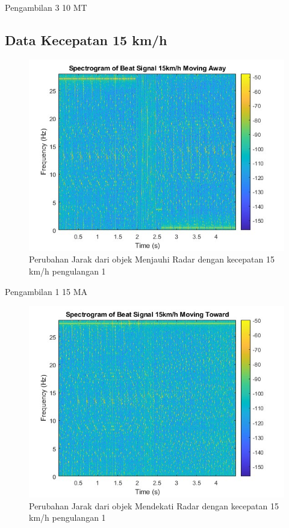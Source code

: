 Pengambilan 3 10 MT

\subsection{Data Kecepatan 15 km/h}

\begin{figure}
	\centering
	\includegraphics[scale=0.6]{pics/bab5/Velocity/1_15MA.jpg}
	\caption{Perubahan Jarak dari objek Menjauhi Radar dengan kecepatan 15 km/h pengulangan 1}
	\label{fig:pengambilan1_15MA}
\end{figure}

Pengambilan 1 15 MA

\begin{figure}
	\centering
	\includegraphics[scale=0.6]{pics/bab5/Velocity/1_15MT.jpg}
	\caption{Perubahan Jarak dari objek Mendekati Radar dengan kecepatan 15 km/h pengulangan 1}
	\label{fig:pengambilan1_15MT}
\end{figure}

